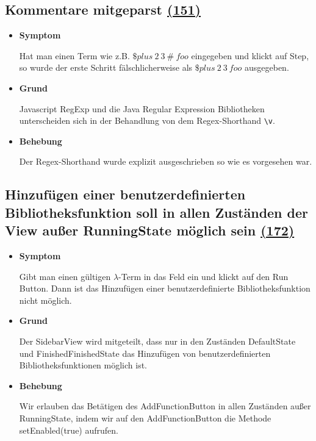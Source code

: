 \documentclass[parskip=full,11pt,twoside]{scrartcl}
\newcommand{\issueref}[1]{
    \href{https://git.scc.kit.edu/ap/Aurora/issues/#1}{(#1)}
}
\newcommand{\regrtest}[5]{
    \subsection{#1 \issueref{#2}}
    \begin{itemize}
        \item \textbf{Symptom}
            #3
        \item \textbf{Grund}
            #4
        \item \textbf{Behebung}
            #5
    \end{itemize}
}
\begin{document}
    \regrtest{Kommentare mitgeparst}{151}{
        Hat man einen Term wie z.B. $\$plus\ 2\ 3\ \#\ foo$ eingegeben und klickt auf Step, so wurde der erste Schritt
        fälschlicherweise als $\$plus\ 2\ 3\ foo$ ausgegeben.
    }{
        Javascript RegExp und die Java Regular Expression Bibliotheken unterscheiden sich in der Behandlung von dem
        Regex-Shorthand \texttt{\textbackslash v}.
    }{
        Der Regex-Shorthand wurde explizit ausgeschrieben so wie es vorgesehen war.
    }
    
    \regrtest{Hinzufügen einer benutzerdefinierten Bibliotheksfunktion soll in allen Zuständen der View außer RunningState möglich sein}{172}{
    	Gibt man einen gültigen $\lambda$-Term in das Feld ein und klickt auf den Run Button. 
		Dann ist das Hinzufügen einer benutzerdefinierte Bibliotheksfunktion nicht möglich.
    }{
    	Der SidebarView wird mitgeteilt, dass nur in den Zuständen DefaultState und 
		FinishedFinishedState das Hinzufügen von benutzerdefinierten Bibliotheksfunktionen möglich ist.
    }{
    	Wir erlauben das Betätigen des AddFunctionButton in allen Zuständen außer RunningState,
		indem wir auf den AddFunctionButton die Methode setEnabled(true) aufrufen.
    }
\end{document}
